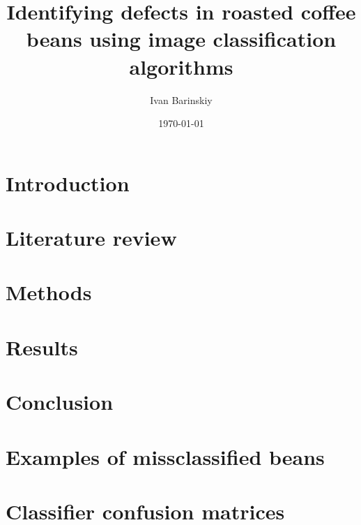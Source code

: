 \documentclass{./template/UoYCSproject}
\author{Ivan Barinskiy}
\date{\today}
\title{Identifying defects in roasted coffee beans using image classification algorithms}
\begin{document}
	\maketitle

	\listoffigures
	\listoftables

	\begin{summary}
		
	\end{summary}

	\chapter{Introduction}
	\label{ch:introduction}
	

	\chapter{Literature review}
	\label{ch:litreview}
	

	\chapter{Methods}
	\label{ch:methods}
	

	\chapter{Results}
	\label{ch:results}
    

	\chapter{Conclusion}
	\label{ch:conclusion}
	

	\appendix
	\chapter{Examples of missclassified beans}
	\label{ch:appendix1}
	
	\chapter{Classifier confusion matrices}
	\label{ch:appendix2}
	

	\printbibliography
\end{document}
